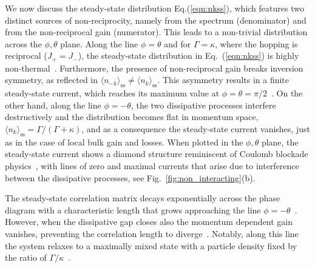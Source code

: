 \documentclass[floatfix,reprint,amsmath,amssymb,superscriptaddress,aps,prl]{revtex4-2}
\begin{document}
We now discuss the steady-state distribution Eq.(\ref{eqn:nkss}), which features two distinct sources of non-reciprocity, namely from the spectrum (denominator) and from the
non-reciprocal gain (numerator). This leads to a non-trivial distribution across the $\phi,\theta$ plane. Along the line $\phi = \theta$ and for $\Gamma=\kappa$, where the hopping is reciprocal ($J_+ = J_-$), the steady-state distribution in Eq.~(\ref{eqn:nkss}) is highly non-thermal~\cite{supplementary_mat}. Furthermore, the presence of non-reciprocal gain breaks inversion symmetry, as reflected in $\langle n_{-k} \rangle_{\text{ss}}\neq \langle n_{k}\rangle_{\text{ss}}$. This asymmetry results in a finite steady-state current, which reaches its maximum value at $\phi = \theta = \pi/2$~\cite{supplementary_mat}. On the other hand, along the line $\phi=-\theta$, the two dissipative processes interfere destructively and the distribution becomes flat in momentum space, $\langle n_{k} \rangle_{\text{ss}}=\Gamma/(\Gamma+\kappa)$, and as a consequence the steady-state current vanishes, just as in the case of local bulk gain and losses.
When plotted in the $\phi,\theta$ plane, the steady-state current shows a diamond structure reminiscent of Coulomb blockade physics~\cite{Nazarov:1186214}, with lines of zero and maximal currents that arise due to interference between the dissipative processes, see Fig.~\ref{fig:non_interacting}(b).



The steady-state correlation matrix decays exponentially across the phase diagram with a characteristic length that grows approaching the line $\phi=-\theta$~\cite{supplementary_mat}. However, when the dissipative gap closes also the momentum dependent gain vanishes, preventing the correlation length to diverge~\cite{zhang2022criticality,Barthel_2022}. Notably, along this line the system relaxes to a maximally mixed state with a particle density fixed by the ratio of $\Gamma/\kappa$~\cite{supplementary_mat}.
\end{document}
